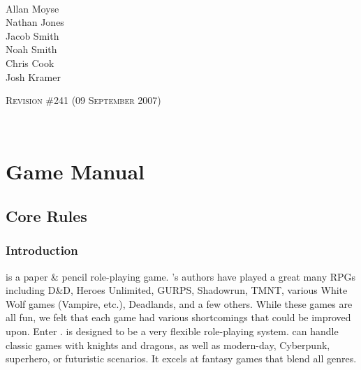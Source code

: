 \documentclass[twoside]{book}
\begin{document}
\begin{titlepage}
~\\~\\~\\~\\~\\~\\~\\~\\~\\~\\
\begin{center}
\ARPG \\

\hspace*{6em}
\vbox{\vspace{-2em}
\small Allan Moyse \\
Nathan Jones \\
Jacob Smith \\
Noah Smith \\
Chris Cook \\
Josh Kramer}

\vskip 2in
\textsc{Revision \#241 (09 September 2007)}
\end{center}

\end{titlepage}

~
\setcounter{page}{1}
\setcounter{tocdepth}{3}
\tableofcontents
\newpage
\listoftables
\newpage
\listoffigures
\newpage
{}
\setcounter{page}{1}


  
    

\part{Game Manual}
    
    

\chapter{Core Rules}
    
    

\section{Introduction}
    
    {  
    \APATHY{}  is a paper \& pencil role-playing game.
            \APATHY{}'s authors have played a great many RPGs
            including D\&D, Heroes Unlimited, GURPS, Shadowrun, TMNT,
            various White Wolf games (Vampire, etc.), Deadlands, and a
            few others. While these games are all fun, we felt that each
            game had various shortcomings that could be improved upon.
            Enter \APATHY{}. \APATHY{}  is designed to be a very
            flexible role-playing system. \APATHY{}  can handle classic
            games with knights and dragons, as well as modern-day,
            Cyberpunk, superhero, or futuristic scenarios. It excels at
            fantasy games that blend all genres.
          
    }
  
\end{document}
